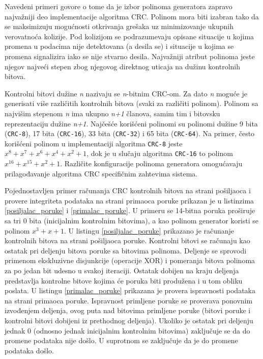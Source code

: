 \documentclass[12pt,oneside]{memoir}
\begin{document}
Navedeni primeri govore o tome da je izbor polinoma generatora zapravo najvažniji deo implementacije algoritma CRC. Polinom mora biti izabran tako da se maksimizuju mogućnosti otkrivanja grešaka uz minimizovanje ukupnih verovatnoća kolizije. Pod kolizijom se podrazumevaju opisane situacije u kojima promena u podacima nije detektovana (a desila se) i situacije u kojima se promena signalizira iako se nije stvarno desila. Najvažniji atribut polinoma jeste njegov najveći stepen zbog njegovog direktnog uticaja na dužinu kontrolnih bitova. 

Kontrolni bitovi dužine \textit{n} nazivaju se \textit{n}-bitnim CRC-om. Za dato \textit{n} moguće je generisati više različitih kontrolnih bitova (svaki za različiti polinom). Polinom sa najvišim stepenom \textit{n} ima ukupno \textit{n+1} članova, samim tim i bitovsku reprezentaciju dužine \textit{n+1}. Najčešće korišćeni polinomi su polinomi dužine 9 bita (\texttt{CRC-8}), 17 bita (\texttt{CRC-16}), 33 bita (\texttt{CRC-32}) i 65 bita (\texttt{CRC-64}). Na primer, često korišćeni polinom u implementaciji algoritma \texttt{CRC-8} jeste $x^8 + x^7 + x^6 + x^4 + x^2 + 1$, dok je u slučaju algoritma \texttt{CRC-16} to polinom $x^{16} + x^{15} + x^2 + 1$. Različite konfiguracije polinoma generatora omogućavaju prilagođavanje algoritma CRC specifičnim zahtevima sistema.

Pojednostavljen primer računanja CRC kontrolnih bitova na strani pošiljaoca i provere integriteta podataka na strani primaoca poruke prikazan je u listinzima \ref{posiljalac_poruke} i \ref{primalac_poruke}. U primeru se 14-bitna poruka proširuje sa tri 0 bita (inicijalnim kontrolnim bitovima), a kao polinom generator koristi se polinom $x^3 + x + 1$. U listingu \ref{posiljalac_poruke} prikazano je računanje kontrolnih bitova na strani pošiljaoca poruke. Kontrolni bitovi se računaju kao ostatak pri deljenju bitova poruke sa bitovima polinoma. Deljenje se sprovodi primenom ekskluzivne disjunkcije (operacije XOR) i pomeranja bitova polinoma za po jedan bit udesno u svakoj iteraciji. Ostatak dobijen na kraju deljenja predstavlja kontrolne bitove kojima će poruka biti produžena i u tom obliku poslata. 
U listingu \ref{primalac_poruke} prikazana je provera ispravnosti podataka na strani primaoca poruke. Ispravnost primljene poruke se proverava ponovnim izvođenjem deljenja, ovog puta nad bitovima primljene poruke (bitovi poruke i kontrolni bitovi dobijeni iz prethodnog deljenja). Ukoliko je ostatak pri deljenju jednak 0 (odnosno jednak inicijalnim kontrolnim bitovima) zaključuje se da do promene podataka nije došlo. U suprotnom se zaključuje da je do promene podataka došlo.
\end{document}
